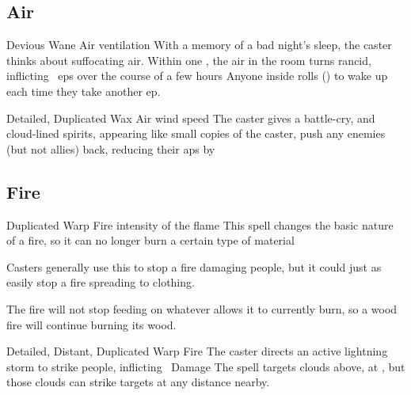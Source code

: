 \begin{multicols}{2}

\subsection{Air}



  {Devious}%
  {Wane}%
  {Air}%
  {ventilation}%
  {With a memory of a bad night's sleep, the caster thinks about suffocating air.
  Within one \showOnset, the air in the room turns rancid, inflicting ~\glspl{ep} over the course of a few hours}%
  {Anyone inside rolls  (\tn[10]) to wake up each time they take another \gls{ep}.}



  {Detailed, Duplicated}%
  {Wax}%
  {Air}%
  {wind speed}%
  {The caster gives a battle-cry, and cloud-lined spirits, appearing like small copies of the caster, push any enemies (but not allies) back, reducing their \glspl{ap} by }%
  {}



\subsection{Fire}



  {Duplicated}%
  {Warp}%
  {Fire}%
  {intensity of the flame}%
  {This spell changes the basic nature of a fire, so it can no longer burn a certain type of material}%
  {Casters generally use this to stop a fire damaging people, but it could just as easily stop a fire spreading to clothing.

    The fire will not stop feeding on whatever allows it to currently burn, so a wood fire will continue burning its wood.}



  {Detailed, Distant, Duplicated}%
  {Warp}%
  {Fire}%
  {}%
  {The caster directs an active lightning storm to strike  people, inflicting \showDam\ Damage}%
  {The spell targets clouds above, at \spellRange, but those clouds can strike targets at any distance nearby.}



\end{multicols}

